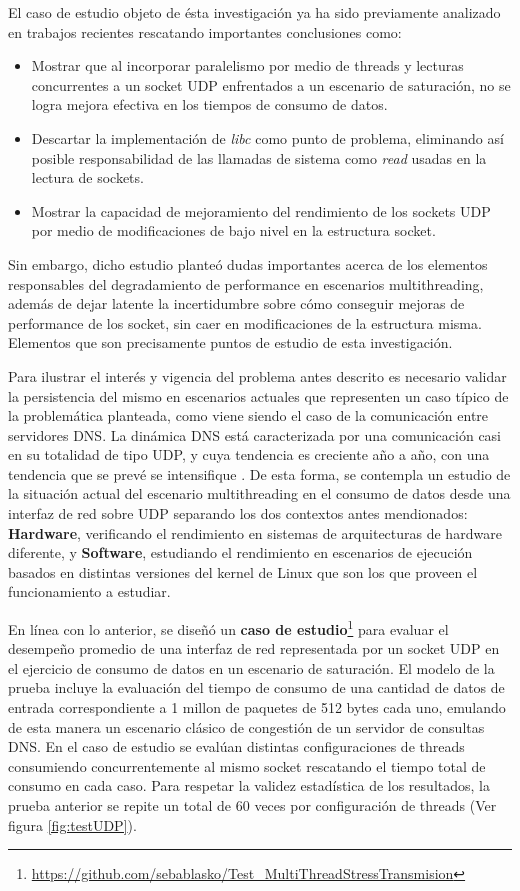 El caso de estudio objeto de ésta investigación ya ha sido previamente analizado en trabajos recientes \cite{tesis:diegoDCC} rescatando importantes conclusiones como:
\begin{itemize}
\item Mostrar que al incorporar paralelismo por medio de threads y lecturas concurrentes a un socket UDP enfrentados a un escenario de saturación, no se logra mejora efectiva en los tiempos de consumo de datos.
\item Descartar la implementación de \emph{libc} como punto de problema, eliminando así posible responsabilidad de las llamadas de sistema como \emph{read} usadas en la lectura de sockets.
\item Mostrar la capacidad de mejoramiento del rendimiento de los sockets UDP por medio de modificaciones de bajo nivel en la estructura socket.
\end{itemize}

Sin embargo, dicho estudio planteó dudas importantes acerca de los elementos responsables del degradamiento de performance en escenarios multithreading, además de dejar latente la incertidumbre sobre cómo conseguir mejoras de performance de los socket, sin caer en modificaciones de la estructura misma. Elementos que son precisamente puntos de estudio de esta investigación.

Para ilustrar el interés y vigencia del problema antes descrito es necesario validar la persistencia del mismo en escenarios actuales que representen un caso típico de la problemática planteada, como viene siendo el caso de la comunicación entre servidores DNS. La dinámica DNS está caracterizada por una comunicación casi en su totalidad de tipo UDP, y cuya tendencia es creciente año a año, con una tendencia que se prevé se intensifique \cite{paper:dnsRootQueries,slides:dnsRootQueries}. De esta forma, se contempla un estudio de la situación actual del escenario multithreading en el consumo de datos desde una interfaz de red sobre UDP separando los dos contextos antes mendionados: \textbf{Hardware}, verificando el rendimiento en sistemas de arquitecturas de hardware diferente, y \textbf{Software}, estudiando el rendimiento en escenarios de ejecución basados en distintas versiones del kernel de Linux que son los que proveen el funcionamiento a estudiar.

En línea con lo anterior, se diseñó un \textbf{caso de estudio}\footnote{\url{https://github.com/sebablasko/Test_MultiThreadStressTransmision}} para evaluar el desempeño promedio de una interfaz de red representada por un socket UDP en el ejercicio de consumo de datos en un escenario de saturación. El modelo de la prueba incluye la evaluación del tiempo de consumo de una cantidad de datos de entrada correspondiente a 1 millon de paquetes de 512 bytes cada uno, emulando de esta manera un escenario clásico de congestión de un servidor de consultas DNS. En el caso de estudio se evalúan distintas configuraciones de threads consumiendo concurrentemente al mismo socket rescatando el tiempo total de consumo en cada caso. Para respetar la validez estadística de los resultados, la prueba anterior se repite un total de 60 veces por configuración de threads (Ver figura \ref{fig:testUDP}).

